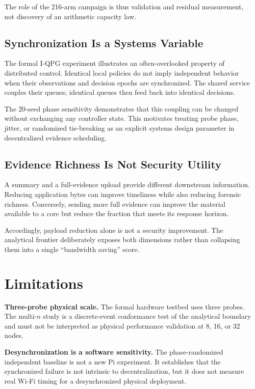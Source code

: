 \documentclass[10pt,journal]{IEEEtran}
\newcommand{\IQPG}{\textsc{I-QPG}}
\begin{document}
The role of the 216-arm campaign is thus validation and residual
measurement, not discovery of an arithmetic capacity law.

\subsection{Synchronization Is a Systems Variable}

The formal \IQPG{} experiment illustrates an often-overlooked property
of distributed control. Identical local policies do not imply independent
behavior when their observations and decision epochs are synchronized.
The shared service couples their queues; identical queues then feed back
into identical decisions.

The 20-seed phase sensitivity demonstrates that this coupling can be
changed without exchanging any controller state. This motivates treating
probe phase, jitter, or randomized tie-breaking as an explicit systems
design parameter in decentralized evidence scheduling.

\subsection{Evidence Richness Is Not Security Utility}

A summary and a full-evidence upload provide different downstream
information. Reducing application bytes can improve timeliness while
also reducing forensic richness. Conversely, sending more full evidence
can improve the material available to a core but reduce the fraction
that meets its response horizon.

Accordingly, payload reduction alone is not a security improvement.
The analytical frontier deliberately exposes both dimensions rather than
collapsing them into a single ``bandwidth saving'' score.

\section{Limitations}
\label{sec:limitations}

\textbf{Three-probe physical scale.}
The formal hardware testbed uses three probes. The multi-$n$ study is a
discrete-event conformance test of the analytical boundary and must not
be interpreted as physical performance validation at 8, 16, or 32 nodes.

\textbf{Desynchronization is a software sensitivity.}
The phase-randomized independent baseline is not a new Pi experiment.
It establishes that the synchronized failure is not intrinsic to
decentralization, but it does not measure real Wi-Fi timing for a
desynchronized physical deployment.
\end{document}
